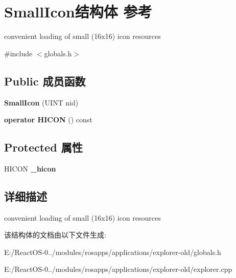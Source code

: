 \hypertarget{struct_small_icon}{}\section{Small\+Icon结构体 参考}
\label{struct_small_icon}


convenient loading of small (16x16) icon resources  




{\ttfamily \#include $<$globals.\+h$>$}

\subsection*{Public 成员函数}
\begin{DoxyCompactItemize}
\item 
\mbox{\label{struct_small_icon_a79e30ec6d7a64bec1948cd42a95b9664}} 
{\bfseries Small\+Icon} (U\+I\+NT nid)
\item 
\mbox{\label{struct_small_icon_ab8bb0bc679cb1d1674c55b70bd967e05}} 
{\bfseries operator H\+I\+C\+ON} () const
\end{DoxyCompactItemize}
\subsection*{Protected 属性}
\begin{DoxyCompactItemize}
\item 
\mbox{\label{struct_small_icon_a1e1d0633f1a88953ceb9270a051e75b5}} 
H\+I\+C\+ON {\bfseries \+\_\+hicon}
\end{DoxyCompactItemize}


\subsection{详细描述}
convenient loading of small (16x16) icon resources 

该结构体的文档由以下文件生成\+:\begin{DoxyCompactItemize}
\item 
E\+:/\+React\+O\+S-\/0../modules/rosapps/applications/explorer-\/old/globals.\+h\item 
E\+:/\+React\+O\+S-\/0../modules/rosapps/applications/explorer-\/old/explorer.\+cpp\end{DoxyCompactItemize}
